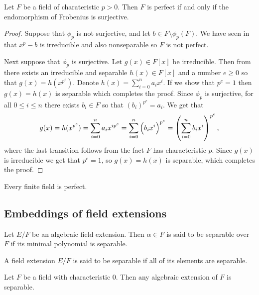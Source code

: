 \documentclass[11pt,a4paper]{article}
\begin{document}
\begin{proposition}
  Let $F$ be a field of charateristic $p > 0$.
  Then $F$ is perfect if and only if the endomorphism of Frobenius
  is surjective.
\end{proposition}
\begin{proof}
  Suppose that $\phi_p$ is not surjective,
  and let $b \in F \setminus \phi_p(F)$.
  We have seen in 
  that $x^p - b$ is irreducible and also nonseparable
  so $F$ is not perfect.

  Next suppose that $\phi_p$ is surjective.
  Let $g(x) \in F[x]$ be irreducible.
  Then from 
  there exists an irreducible and separable $h(x) \in F[x]$
  and a number $e \geq 0$ so that $g(x) = h(x^{p^e})$.
  Denote $h(x) = \sum_{i=0}^{n} a_i x^i$.
  If we show that $p^e = 1$ then $g(x) = h(x)$
  is separable which completes the proof.
  Since $\phi_p$ is surjective, for all $0 \le i \le n$ there exists
  $b_i \in F$ so that $(b_i)^{p^e} = a_i$.
  We get that
  \[
    g(x) =
    h(x^{p^e}) =
    \sum_{i=0}^{n} a_i x^{i p^e} =
    \sum_{i=0}^{n} \del{b_i x^{i}}^{p^e} =
    \del{\sum_{i=0}^{n} b_i x^{i}}^{p^e},
  \]
  where the last transition follows from the fact $F$ has characteristic
  $p$.
  Since $g(x)$ is irreducible we get that $p^e = 1$, so
  $g(x) = h(x)$ is separable, which completes the proof.
\end{proof}

\begin{remark}
  Every finite field is perfect.
\end{remark}

\subsection{Embeddings of field extensions}

\begin{definition}
  Let $E/F$ be an algebraic field extension.
  Then $\alpha \in F$ is said to be separable over $F$ if
  its minimal polynomial is separable.
\end{definition}

\begin{definition}
  A field extension $E/F$ is said to be separable if all of its elements
  are separable.
\end{definition}

\begin{example}
  Let $F$ be a field with characteristic $0$.
  Then any algebraic extension of $F$ is separable.
\end{example}
\end{document}
